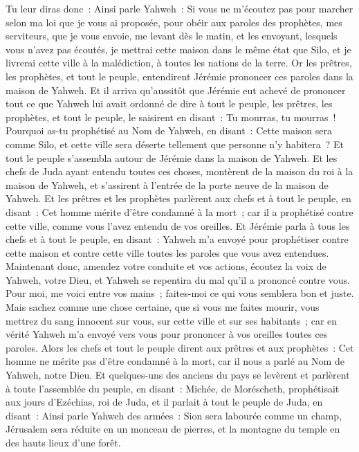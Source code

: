 \begin{multicols}{2}
Tu leur diras donc~: Ainsi parle Yahweh~: Si vous ne m'écoutez pas pour marcher selon ma loi que je vous ai proposée,
pour obéir aux paroles des prophètes, mes serviteurs, que je vous envoie, me levant dès le matin, et les envoyant, lesquels vous n'avez pas écoutés,
je mettrai cette maison dans le même état que Silo, et je livrerai cette ville à la malédiction, à toutes les nations de la terre.
Or les prêtres, les prophètes, et tout le peuple, entendirent Jérémie prononcer ces paroles dans la maison de Yahweh.
Et il arriva qu'aussitôt que Jérémie eut achevé de prononcer tout ce que Yahweh lui avait ordonné de dire à tout le peuple, les prêtres, les prophètes, et tout le peuple, le saisirent en disant~: Tu mourras, tu mourras~!
Pourquoi as-tu prophétisé au Nom de Yahweh, en disant~: Cette maison sera comme Silo, et cette ville sera déserte tellement que personne n'y habitera~? Et tout le peuple s'assembla autour de Jérémie dans la maison de Yahweh.
Et les chefs de Juda ayant entendu toutes ces choses, montèrent de la maison du roi à la maison de Yahweh, et s'assirent à l'entrée de la porte neuve de la maison de Yahweh.
Et les prêtres et les prophètes parlèrent aux chefs et à tout le peuple, en disant~: Cet homme mérite d'être condamné à la mort~; car il a prophétisé contre cette ville, comme vous l'avez entendu de vos oreilles.
Et Jérémie parla à tous les chefs et à tout le peuple, en disant~: Yahweh m'a envoyé pour prophétiser contre cette maison et contre cette ville toutes les paroles que vous avez entendues.
Maintenant donc, amendez votre conduite et vos actions, écoutez la voix de Yahweh, votre Dieu, et Yahweh se repentira du mal qu'il a prononcé contre vous.
Pour moi, me voici entre vos mains~; faites-moi ce qui vous semblera bon et juste.
Mais sachez comme une chose certaine, que si vous me faites mourir, vous mettrez du sang innocent sur vous, sur cette ville et sur ses habitants~; car en vérité Yahweh m'a envoyé vers vous pour prononcer à vos oreilles toutes ces paroles.
Alors les chefs et tout le peuple dirent aux prêtres et aux prophètes~: Cet homme ne mérite pas d'être condamné à la mort, car il nous a parlé au Nom de Yahweh, notre Dieu.
Et quelques-uns des anciens du pays se levèrent et parlèrent à toute l'assemblée du peuple, en disant~:
Michée, de Moréscheth, prophétisait aux jours d'Ezéchias, roi de Juda, et il parlait à tout le peuple de Juda, en disant~: Ainsi parle Yahweh des armées~: Sion sera labourée comme un champ, Jérusalem sera réduite en un monceau de pierres, et la montagne du temple en des hauts lieux d'une forêt.

\end{multicols}
